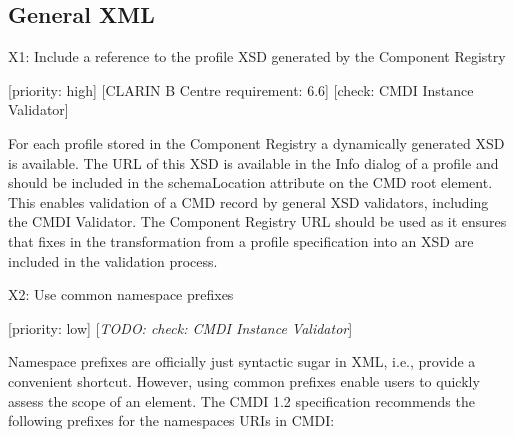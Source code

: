 \documentclass[]{article}
\date{}
\begin{document}
\subsection{General XML}\label{general-xml}

X1: Include a reference to the profile XSD generated by the Component
Registry

{[}priority: high{]} {[}CLARIN B Centre requirement: 6.6{]} {[}check:
CMDI Instance Validator{]}

For each profile stored in the Component Registry a dynamically
generated XSD is available. The URL of this XSD is available in the Info
dialog of a profile and should be included in the schemaLocation
attribute on the CMD root element. This enables validation of a CMD
record by general XSD validators, including the CMDI Validator. The
Component Registry URL should be used as it ensures that fixes in the
transformation from a profile specification into an XSD are included in
the validation process.

X2: Use common namespace prefixes

{[}priority: low{]} {[}\emph{TODO: check: CMDI Instance Validator}{]}

Namespace prefixes are officially just syntactic sugar in XML, i.e.,
provide a convenient shortcut. However, using common prefixes enable
users to quickly assess the scope of an element. The CMDI 1.2
specification recommends the following prefixes for the namespaces URIs
in CMDI:
\end{document}
